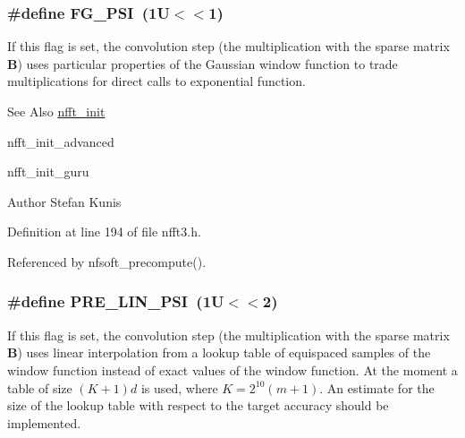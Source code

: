 \hypertarget{group__nfft_ga01ebac2d2071639df189f083fc9f24eb}{
\subsubsection[{F\-G\-\_\-\-P\-S\-I}]{\setlength{\rightskip}{0pt plus 5cm}\#define F\-G\-\_\-\-P\-S\-I~(1\-U$<$$<$1)}}\label{group__nfft_ga01ebac2d2071639df189f083fc9f24eb}
If this flag is set, the convolution step (the multiplication with the sparse matrix $\mathbf{B}$) uses particular properties of the Gaussian window function to trade multiplications for direct calls to exponential function.

\begin{DoxySeeAlso}{See Also}
\hyperlink{group__nfft_ga1dfeaf18f3735f035afa62ca768d99c4}{nfft\-\_\-init} 

nfft\-\_\-init\-\_\-advanced 

nfft\-\_\-init\-\_\-guru 
\end{DoxySeeAlso}
\begin{DoxyAuthor}{Author}
Stefan Kunis 
\end{DoxyAuthor}


Definition at line 194 of file nfft3.\-h.



Referenced by nfsoft\-\_\-precompute().

\hypertarget{group__nfft_gabb1ad048b695cb806baf010c5d1b2caf}{
\subsubsection[{P\-R\-E\-\_\-\-L\-I\-N\-\_\-\-P\-S\-I}]{\setlength{\rightskip}{0pt plus 5cm}\#define P\-R\-E\-\_\-\-L\-I\-N\-\_\-\-P\-S\-I~(1\-U$<$$<$2)}}\label{group__nfft_gabb1ad048b695cb806baf010c5d1b2caf}
If this flag is set, the convolution step (the multiplication with the sparse matrix $\mathbf{B}$) uses linear interpolation from a lookup table of equispaced samples of the window function instead of exact values of the window function. At the moment a table of size $(K+1)d$ is used, where $K=2^{10}(m+1)$. An estimate for the size of the lookup table with respect to the target accuracy should be implemented.

